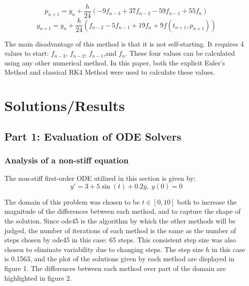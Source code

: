 \documentclass[11pt]{article}
\begin{document}
$$p_{n+1}=y_{n}+\frac{h}{24}(-9f_{n-3}+37f_{n-2}-59f_{n-1}+55f_{n})$$
$$y_{n+1}=y_{n}+\frac{h}{24}(f_{n-2}-5f_{n-1}+19f_{n}+9f(t_{n+1}, p_{n+1}))$$

The main disadvantage of this method is that it is not self-starting. It requires 
4 values to start: $f_{n-3}$, $f_{n-2}$, $f_{n-1}$,and $f_{n}$. These four values 
can be calculated using any other numerical method. In this paper, both the 
explicit Euler's Method and classical RK4 Method were used to calculate these values.

\section{Solutions/Results}\label{S:4}

\subsection{Part 1: Evaluation of ODE Solvers}
%

\subsubsection{Analysis of a non-stiff equation}
%

The non-stiff first-order ODE utilized in this section is given by:
$$y'=3+5\sin(t)+0.2y,\; y(0)=0$$

The domain of this problem was chosen to be $t\in [0,10]$ both to increase the 
magnitude of the differences between each method, and to capture the shape of
the solution. Since ode45 is the algorithm by which the other methods will be judged, 
the number of iterations of each method is the same as the number of steps chosen
by ode45 in this case: 65 steps. This consistent step size was also chosen to 
eliminate variability due to changing steps. The step size $h$ in this case is
0.1563, and the plot of the solutions given by each method are displayed in figure
1. The differences between each method over part of the domain are highlighted in figure 2.
\end{document}
